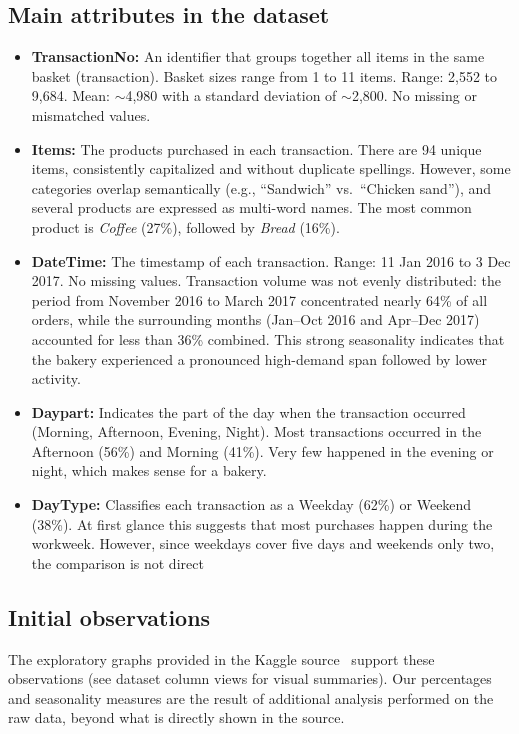 \subsection*{Main attributes in the dataset}
\begin{itemize}
    \item \textbf{TransactionNo:} An identifier that groups together all items in the same basket (transaction).  
    Basket sizes range from 1 to 11 items.  
    Range: 2,552 to 9,684.  
    Mean: $\sim$4,980 with a standard deviation of $\sim$2,800.  
    No missing or mismatched values.  

    \item \textbf{Items:} The products purchased in each transaction.  
There are 94 unique items, consistently capitalized and without duplicate spellings.  
However, some categories overlap semantically (e.g., ``Sandwich'' vs.\ ``Chicken sand''), 
and several products are expressed as multi-word names.  
The most common product is \textit{Coffee} (27\%), followed by \textit{Bread} (16\%).  

    \item \textbf{DateTime:} The timestamp of each transaction.  
    Range: 11 Jan 2016 to 3 Dec 2017.  
    No missing values.  
    Transaction volume was not evenly distributed: the period from 
    November 2016 to March 2017 concentrated nearly 64\% of all orders, 
    while the surrounding months (Jan--Oct 2016 and Apr--Dec 2017) 
    accounted for less than 36\% combined.  
    This strong seasonality indicates that the bakery experienced 
    a pronounced high-demand span followed by lower activity.  

    \item \textbf{Daypart:} Indicates the part of the day when the transaction occurred (Morning, Afternoon, Evening, Night).  
    Most transactions occurred in the Afternoon (56\%) and Morning (41\%).  
    Very few happened in the evening or night, which makes sense for a bakery.  

    \item \textbf{DayType:} Classifies each transaction as a Weekday (62\%) or Weekend (38\%).  
    At first glance this suggests that most purchases happen during the workweek. 
    However, since weekdays cover five days and weekends only two, the comparison is not direct

\end{itemize}

\subsection*{Initial observations}
The exploratory graphs provided in the Kaggle source~\cite{bakerydata} 
support these observations (see dataset column views for visual summaries).  
Our percentages and seasonality measures are the result of additional analysis 
performed on the raw data, beyond what is directly shown in the source.  


